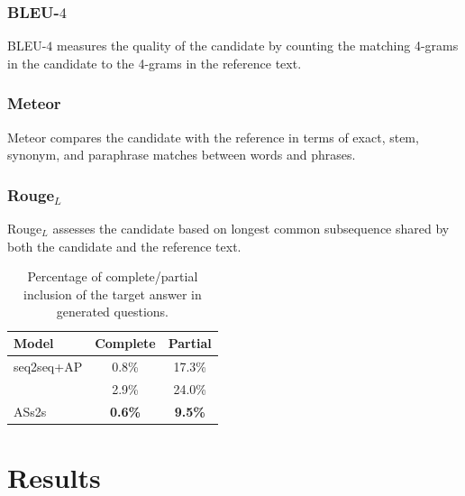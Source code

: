 \documentclass[letterpaper]{article} %
\newcommand\Tstrut{\rule{0pt}{2.3ex}}         %
\begin{document}
\subsubsection{BLEU-\(4\)}
BLEU-\(4\) measures the quality of the candidate by counting the matching 4-grams in the candidate to the 4-grams in the reference text.

\subsubsection{Meteor}
Meteor compares the candidate with the reference in terms of exact, stem, synonym, and paraphrase matches between words and phrases.
% 
%    
% 

\subsubsection{Rouge\(_L\)}
Rouge\(_L\) assesses the candidate based on longest common subsequence shared by both the candidate and the reference text.

\begin{table}[!tb]
\centering
\begin{tabular}{|l|c|c|}
\hline
Model        & Complete & Partial\Tstrut  \\ \hline
seq2seq+AP & 0.8\%            & 17.3\%\Tstrut               \\ \hline
\cite{song2018leveraging}  & 2.9\%        & 24.0\%\Tstrut          \\ \hline
ASs2s    & \textbf{0.6\%}        & \textbf{9.5\%}\Tstrut           \\ \hline
\end{tabular}%
\caption{Percentage of complete/partial inclusion of the target answer in generated questions.}
\label{table:grasp answer}
\end{table}

\section{Results}
\end{document}
